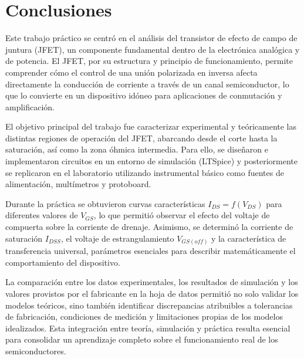 \chapter{Conclusiones}
Este trabajo práctico se centró en el análisis del transistor de efecto de campo de juntura (JFET), un
componente fundamental dentro de la electrónica analógica y de potencia. El JFET, por su estructura y
principio de funcionamiento, permite comprender cómo el control de una unión polarizada en inversa
afecta directamente la conducción de corriente a través de un canal semiconductor, lo que lo convierte
en un dispositivo idóneo para aplicaciones de conmutación y amplificación.  

El objetivo principal del trabajo fue caracterizar experimental y teóricamente las distintas regiones 
de operación del JFET, abarcando desde el corte hasta la saturación, así como la zona óhmica 
intermedia. Para ello, se diseñaron e implementaron circuitos en un entorno de simulación (LTSpice) 
y posteriormente se replicaron en el laboratorio utilizando instrumental básico como fuentes de 
alimentación, multímetros y protoboard.  

Durante la práctica se obtuvieron curvas características $I_{DS} = f(V_{DS})$ para diferentes valores 
de $V_{GS}$, lo que permitió observar el efecto del voltaje de compuerta sobre la corriente de drenaje. 
Asimismo, se determinó la corriente de saturación $I_{DSS}$, el voltaje de estrangulamiento 
$V_{GS(off)}$ y la característica de transferencia universal, parámetros esenciales para describir 
matemáticamente el comportamiento del dispositivo.  

La comparación entre los datos experimentales, los resultados de simulación y los valores provistos 
por el fabricante en la hoja de datos permitió no solo validar los modelos teóricos, sino también 
identificar discrepancias atribuibles a tolerancias de fabricación, condiciones de medición y 
limitaciones propias de los modelos idealizados. Esta integración entre teoría, simulación y práctica 
resulta esencial para consolidar un aprendizaje completo sobre el funcionamiento real de los 
semiconductores.   
